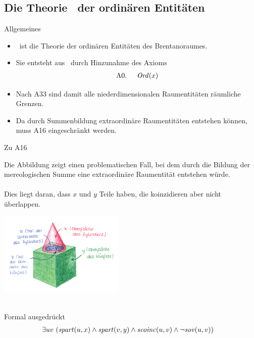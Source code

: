 \documentclass[10pt,xcolor={dvipsnames}]{beamer}
\begin{document}
\subsection{Die Theorie \bso\ der ordinären Entitäten}

\begin{frame}{\bso}{Allgemeines}
    \begin{itemize}
        \item 
            \bso\ ist die Theorie der ordinären Entitäten des Brentanoraumes.
        \item 
            Sie entsteht aus \bs\ durch Hinzunahme des Axioms
            \begin{align*}
                \text{A0. } \quad \mathit{Ord}(x)
            \end{align*}
        \item 
            Nach A33 sind damit alle niederdimensionalen Raumentitäten räumliche Grenzen.
        \item
            Da durch Summenbildung extraordinäre Raumentitäten entstehen können, muss A16 eingeschränkt werden.
    \end{itemize}
\end{frame}

\begin{frame}{\bso}{Zu A16}
    \parbox{0.48\textwidth}{
        Die Abbildung zeigt einen problematischen Fall, bei dem durch die Bildung der mereologischen Summe eine extraordinäre Raumentität entstehen würde.
        \\ \ \\
        Dies liegt daran, dass $x$ und $y$ Teile haben, die koinzidieren aber nicht überlappen.
    }
    \hfill\mbox{}\hfill
    \parbox{0.5\textwidth}{
        \begin{center}
            \includegraphics[height=4cm]{img/a16_transparent.png}
        \end{center}
    }\\
    \vspace{8pt}
    Formal ausgedrückt
        \begin{align*}
            \exists uv\ &(\mathit{spart}(u,x) \wedge \mathit{spart}(v,y) \wedge \mathit{scoinc}(u,v) \wedge \neg \mathit{sov}(u,v))
        \end{align*}
\end{frame}
\end{document}
